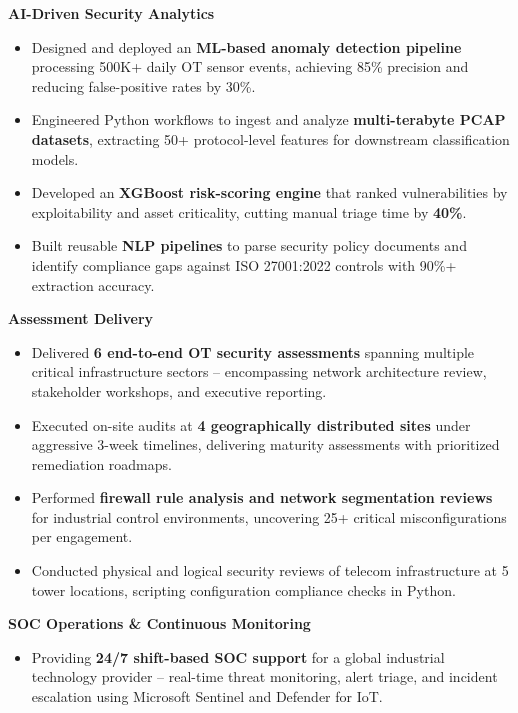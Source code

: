 \documentclass[11pt,letterpaper]{article}
\begin{document}
\vspace{4pt}
\textbf{AI-Driven Security Analytics}
\begin{itemize}
  \item Designed and deployed an \textbf{ML-based anomaly detection pipeline} processing 500K+ daily OT sensor events, achieving 85\% precision and reducing false-positive rates by 30\%.
  \item Engineered Python workflows to ingest and analyze \textbf{multi-terabyte PCAP datasets}, extracting 50+ protocol-level features for downstream classification models.
  \item Developed an \textbf{XGBoost risk-scoring engine} that ranked vulnerabilities by exploitability and asset criticality, cutting manual triage time by \textbf{40\%}.
  \item Built reusable \textbf{NLP pipelines} to parse security policy documents and identify compliance gaps against ISO 27001:2022 controls with 90\%+ extraction accuracy.
\end{itemize}

\vspace{4pt}
\textbf{Assessment Delivery}
\begin{itemize}
  \item Delivered \textbf{6 end-to-end OT security assessments} spanning multiple critical infrastructure sectors -- encompassing network architecture review, stakeholder workshops, and executive reporting.
  \item Executed on-site audits at \textbf{4 geographically distributed sites} under aggressive 3-week timelines, delivering maturity assessments with prioritized remediation roadmaps.
  \item Performed \textbf{firewall rule analysis and network segmentation reviews} for industrial control environments, uncovering 25+ critical misconfigurations per engagement.
  \item Conducted physical and logical security reviews of telecom infrastructure at 5 tower locations, scripting configuration compliance checks in Python.
\end{itemize}

\vspace{4pt}
\textbf{SOC Operations \& Continuous Monitoring}
\begin{itemize}
  \item Providing \textbf{24/7 shift-based SOC support} for a global industrial technology provider -- real-time threat monitoring, alert triage, and incident escalation using Microsoft Sentinel and Defender for IoT.
\end{itemize}
\end{document}
